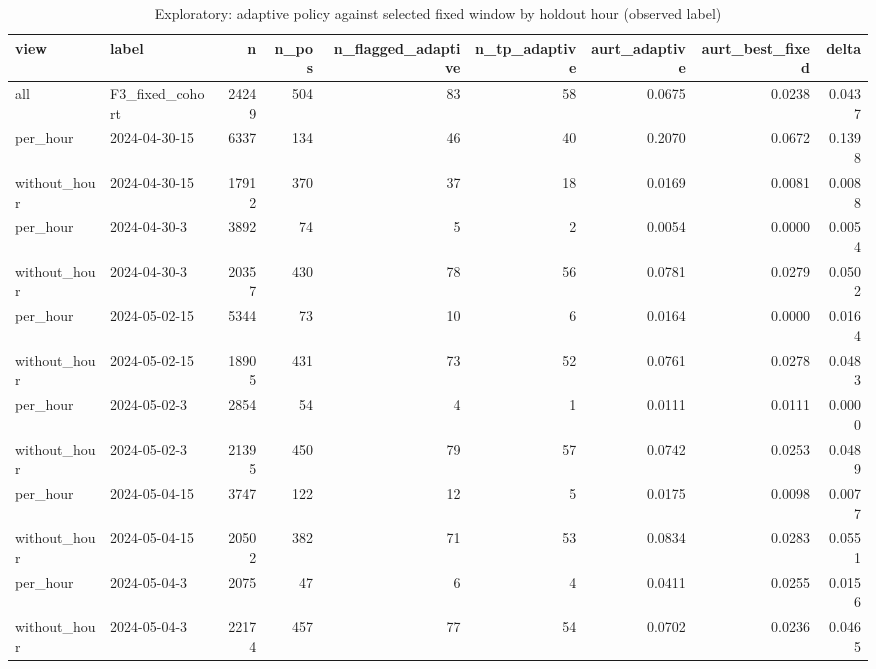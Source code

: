 \begin{table}
\caption{Exploratory: adaptive policy against selected fixed window by holdout hour (observed label)}
\label{tab:tab_exploratory_policy_by_hour}
\begin{tabular}{llrrrrrrr}
\toprule
view & label & n & n\_pos & n\_flagged\_adaptive & n\_tp\_adaptive & aurt\_adaptive & aurt\_best\_fixed & delta \\
\midrule
all & F3\_fixed\_cohort & 24249 & 504 & 83 & 58 & 0.0675 & 0.0238 & 0.0437 \\
per\_hour & 2024-04-30-15 & 6337 & 134 & 46 & 40 & 0.2070 & 0.0672 & 0.1398 \\
without\_hour & 2024-04-30-15 & 17912 & 370 & 37 & 18 & 0.0169 & 0.0081 & 0.0088 \\
per\_hour & 2024-04-30-3 & 3892 & 74 & 5 & 2 & 0.0054 & 0.0000 & 0.0054 \\
without\_hour & 2024-04-30-3 & 20357 & 430 & 78 & 56 & 0.0781 & 0.0279 & 0.0502 \\
per\_hour & 2024-05-02-15 & 5344 & 73 & 10 & 6 & 0.0164 & 0.0000 & 0.0164 \\
without\_hour & 2024-05-02-15 & 18905 & 431 & 73 & 52 & 0.0761 & 0.0278 & 0.0483 \\
per\_hour & 2024-05-02-3 & 2854 & 54 & 4 & 1 & 0.0111 & 0.0111 & 0.0000 \\
without\_hour & 2024-05-02-3 & 21395 & 450 & 79 & 57 & 0.0742 & 0.0253 & 0.0489 \\
per\_hour & 2024-05-04-15 & 3747 & 122 & 12 & 5 & 0.0175 & 0.0098 & 0.0077 \\
without\_hour & 2024-05-04-15 & 20502 & 382 & 71 & 53 & 0.0834 & 0.0283 & 0.0551 \\
per\_hour & 2024-05-04-3 & 2075 & 47 & 6 & 4 & 0.0411 & 0.0255 & 0.0156 \\
without\_hour & 2024-05-04-3 & 22174 & 457 & 77 & 54 & 0.0702 & 0.0236 & 0.0465 \\
\bottomrule
\end{tabular}
\end{table}
